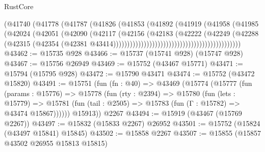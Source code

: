 \begin{lexlean}{RustCore}
\begin{coremodule}
                                                      (@41740
                                                        (@41778
                                                          (@41787
                                                            (@41826
                                                              (@41853
                                                                (@41892
                                                                  (@41919
                                                                    (@41958
                                                                      (@41985
                                                                        (@42024
                                                                          (@42051
                                                                            (@42090
                                                                              (@42117
                                                                                (@42156
                                                                                  (@42183
                                                                                    (@42222
                                                                                      (@42249
                                                                                        (@42288
                                                                                          (@42315
                                                                                            (@42354
                                                                                              (@42381
                                                                                                @43414))))))))))))))))))))))))))))))))))))))))))))))
@43462 := @15735 @928
@43466 := @15737 (@15741 @928) (@15747 @928)
@43467 := @15756 @26949
@43469 := @15752 (@43467 @15771)
@43471 := @15794 (@15795 @928)
@43472 := @15790 @43471
@43474 := @15752 (@43472 @15820)
@43491 := @15751
    (fun (fn : @40) =>
    @43469
      (@15774
        (@15777
          (fun (params : @15776) =>
          @15778
            (fun (rty : @2394) =>
            @15780
              (fun (lets : @15779) =>
              @15781 (fun (tail : @2505) => @15783 (fun (Γ : @15782) => @43474 @15867))))))
        @15913))
    @2267
@43494 := @15919 (@43467 (@15769 @2267))
@43497 := @15832 (@15833 @2267) @26952
@43501 := @15752 (@15824 (@43497 @15841) @15845)
@43502 := @15858 @2267
@43507 := @15855 (@15857 @43502 @26955 @15813 @15815)

\end{coremodule}
\end{lexlean}
